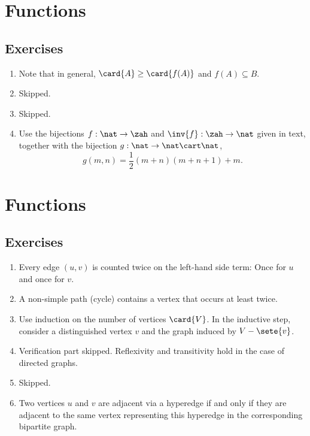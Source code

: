 \section{Functions}
\subsection*{Exercises}
\begin{enumerate}[\thesection-1]
%
\item Note that in general, $\card{A} \geq \card{f(A)}$ and $f(A) \subseteq B$.
%
\item Skipped.
%
\item Skipped.
%
\item Use the bijections $f : \nat \to \zah$ and $\inv{f} : \zah \to \nat$ given in text, together with the bijection $g : \nat \to \nat \cart \nat$,
\[
g(m, n) = \frac{1}{2}(m + n)(m + n + 1) + m.
\]
%
\end{enumerate}

\section{Functions}
\subsection*{Exercises}
\begin{enumerate}[\thesection-1]
%
\item Every edge $(u, v)$ is counted twice on the left-hand side term: Once for $u$ and once for $v$.
%
\item A non-simple path (cycle) contains a vertex that occurs at least twice.
%
\item Use induction on the number of vertices $\card{V}$. In the inductive step, consider a distinguished vertex $v$ and the graph induced by $V - \sete{v}$.
%
\item Verification part skipped. Reflexivity and transitivity hold in the case of directed graphs.
%
\item Skipped.
%
\item Two vertices $u$ and $v$ are adjacent via a hyperedge if and only if they are adjacent to the same vertex representing this hyperedge in the corresponding bipartite graph.
%
\end{enumerate}

